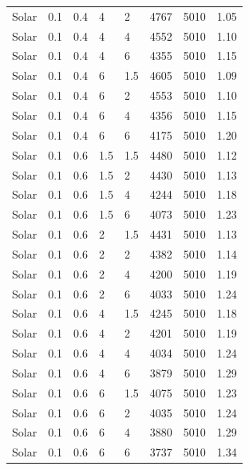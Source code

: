\begin{table}
\begin{tabular}{llllllll}
		Solar & 0.1 & 0.4 & 4 & 2 & 4767 & 5010 & 1.05 \\
		Solar & 0.1 & 0.4 & 4 & 4 & 4552 & 5010 & 1.10 \\
		Solar & 0.1 & 0.4 & 4 & 6 & 4355 & 5010 & 1.15 \\
		Solar & 0.1 & 0.4 & 6 & 1.5 & 4605 & 5010 & 1.09 \\
		Solar & 0.1 & 0.4 & 6 & 2 & 4553 & 5010 & 1.10 \\
		Solar & 0.1 & 0.4 & 6 & 4 & 4356 & 5010 & 1.15 \\
		Solar & 0.1 & 0.4 & 6 & 6 & 4175 & 5010 & 1.20 \\
		Solar & 0.1 & 0.6 & 1.5 & 1.5 & 4480 & 5010 & 1.12 \\
		Solar & 0.1 & 0.6 & 1.5 & 2 & 4430 & 5010 & 1.13 \\
		Solar & 0.1 & 0.6 & 1.5 & 4 & 4244 & 5010 & 1.18 \\
		Solar & 0.1 & 0.6 & 1.5 & 6 & 4073 & 5010 & 1.23 \\
		Solar & 0.1 & 0.6 & 2 & 1.5 & 4431 & 5010 & 1.13 \\
		Solar & 0.1 & 0.6 & 2 & 2 & 4382 & 5010 & 1.14 \\
		Solar & 0.1 & 0.6 & 2 & 4 & 4200 & 5010 & 1.19 \\
		Solar & 0.1 & 0.6 & 2 & 6 & 4033 & 5010 & 1.24 \\
		Solar & 0.1 & 0.6 & 4 & 1.5 & 4245 & 5010 & 1.18 \\
		Solar & 0.1 & 0.6 & 4 & 2 & 4201 & 5010 & 1.19 \\
		Solar & 0.1 & 0.6 & 4 & 4 & 4034 & 5010 & 1.24 \\
		Solar & 0.1 & 0.6 & 4 & 6 & 3879 & 5010 & 1.29 \\
		Solar & 0.1 & 0.6 & 6 & 1.5 & 4075 & 5010 & 1.23 \\
		Solar & 0.1 & 0.6 & 6 & 2 & 4035 & 5010 & 1.24 \\
		Solar & 0.1 & 0.6 & 6 & 4 & 3880 & 5010 & 1.29 \\
		Solar & 0.1 & 0.6 & 6 & 6 & 3737 & 5010 & 1.34 \\
		\bottomrule
		\end{tabular}
\end{table}	

